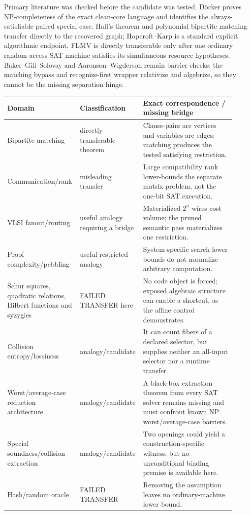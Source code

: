 \documentclass[11pt]{article}
\begin{document}
Primary literature was checked before the candidate was tested.
Döcker proves NP-completeness of the exact clean-core language and identifies
the always-satisfiable paired special case.  Hall's theorem and polynomial
bipartite matching transfer directly to the recovered graph; Hopcroft--Karp
is a standard explicit algorithmic endpoint.  FLMV is directly transferable
only after one ordinary random-access SAT machine satisfies its simultaneous
resource hypotheses.  Baker--Gill--Solovay and Aaronson--Wigderson remain
barrier checks: the matching bypass and recognize-first wrapper relativize
and algebrize, so they cannot be the missing separation hinge.

\begin{center}\small
\begin{tabular}{p{0.29\linewidth}p{0.23\linewidth}p{0.40\linewidth}}
\toprule
Domain & Classification & Exact correspondence / missing bridge\\
\midrule
Bipartite matching & directly transferable theorem &
Clause-pairs are vertices and variables are edges; matching produces the
tested satisfying restriction.\\
Communication/rank & misleading transfer &
Large compatibility rank lower-bounds the separate matrix problem, not the
one-bit SAT execution.\\
VLSI fanout/routing & useful analogy requiring a bridge &
Materialized $2^n$ wires cost volume; the pruned semantic pass materializes
one restriction.\\
Proof complexity/pebbling & useful restricted analogy &
System-specific search lower bounds do not normalize arbitrary computation.\\
Schur squares, quadratic relations, Hilbert functions and syzygies &
FAILED TRANSFER here &
No code object is forced; exposed algebraic structure can enable a shortcut,
as the affine control demonstrates.\\
Collision entropy/lossiness & analogy/candidate &
It can count fibers of a declared selector, but supplies neither an all-input
selector nor a runtime transfer.\\
Worst/average-case reduction architecture & analogy/candidate &
A black-box extraction theorem from every SAT solver remains missing and
must confront known NP worst/average-case barriers.\\
Special soundness/collision extraction & analogy/candidate &
Two openings could yield a construction-specific witness, but no
unconditional binding premise is available here.\\
Hash/random oracle & FAILED TRANSFER &
Removing the assumption leaves no ordinary-machine lower bound.\\
\bottomrule
\end{tabular}
\end{center}
\end{document}
